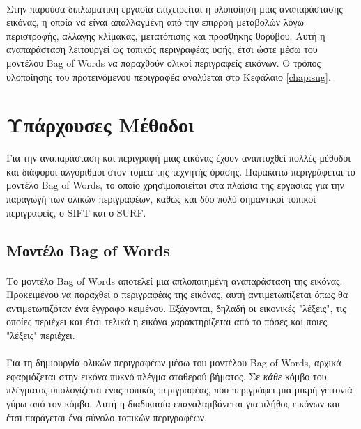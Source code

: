 \paragraph*{}
Στην παρούσα διπλωματική εργασία επιχειρείται η υλοποίηση μιας αναπαράστασης εικόνας, η οποία να είναι απαλλαγμένη από την επιρροή μεταβολών λόγω περιστροφής, αλλαγής κλίμακας, μετατόπισης και προσθήκης θορύβου. Αυτή η αναπαράσταση λειτουργεί ως τοπικός περιγραφέας υφής, έτσι ώστε μέσω του μοντέλου Bag of Words να παραχθούν ολικοί περιγραφείς εικόνων. Ο τρόπος υλοποίησης του προτεινόμενου περιγραφέα αναλύεται στο Κεφάλαιο \ref{chap:sug}.


\section{Υπάρχουσες Μέθοδοι}

Για την αναπαράσταση και περιγραφή μιας εικόνας έχουν αναπτυχθεί πολλές μέθοδοι και διάφοροι αλγόριθμοι στον τομέα της τεχνητής όρασης. Παρακάτω περιγράφεται το μοντέλο Bag of Words, το οποίο χρησιμοποιείται στα πλαίσια της εργασίας για την παραγωγή των ολικών περιγραφέων, καθώς και δύο πολύ σημαντικοί τοπικοί περιγραφείς, ο SIFT και ο SURF.

\subsection{Μοντέλο Bag of Words}
\paragraph*{}
Το μοντέλο Bag of Words \cite{bow} αποτελεί μια απλοποιημένη αναπαράσταση της εικόνας. Προκειμένου να παραχθεί ο περιγραφέας της εικόνας, αυτή αντιμετωπίζεται όπως θα αντιμετωπιζόταν ένα έγγραφο κειμένου. Εξάγονται, δηλαδή οι εικονικές "λέξεις", τις οποίες περιέχει και έτσι τελικά η εικόνα χαρακτηρίζεται από το πόσες και ποιες "λέξεις" περιέχει.

\paragraph*{}
Για τη δημιουργία ολικών περιγραφέων μέσω του μοντέλου Bag of Words, αρχικά εφαρμόζεται στην εικόνα πυκνό πλέγμα σταθερού βήματος. Σε \textit{κάθε} κόμβο του πλέγματος υπολογίζεται ένας τοπικός περιγραφέας, που περιγράφει μια μικρή γειτονιά γύρω από τον κόμβο. Αυτή η διαδικασία επαναλαμβάνεται για πλήθος εικόνων και έτσι παράγεται ένα σύνολο τοπικών περιγραφέων.

